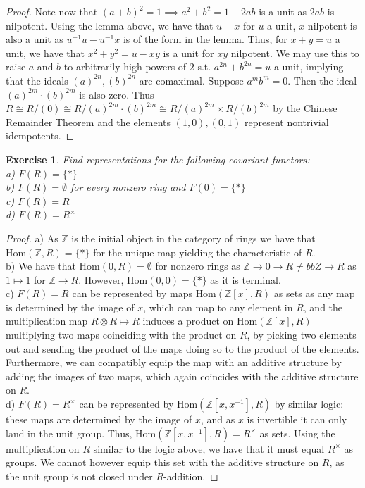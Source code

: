 \documentclass{article}
\newcommand{\Hom}{\text{Hom}}
\newcommand{\bb}[1]{\mathbb{#1}}
\newcommand{\iso}{\cong}
\newtheorem{exercise}{Exercise}
\begin{document}
\begin{proof}
  Note now that $(a + b)^{2} = 1 \implies a^{2}+b^{2} = 1 - 2ab$ is a unit as $2ab$ is nilpotent. Using the lemma above, we have that $u - x$ for $u$ a unit, $x$ nilpotent is also a unit as $u^{-1}u - u^{-1}x$ is of the form in the lemma. Thus, for $x + y = u$ a unit, we have that $x^{2} + y^{2} = u - xy$ is a unit for $xy$ nilpotent. We may use this to raise $a$ and $b$ to arbitrarily high powers of $2$ s.t. $a^{2n} + b^{2n} = u$ a unit, implying that the ideals $(a)^{2n}, (b)^{2n}$ are comaximal. Suppose $a^{m}b^{m} = 0$. Then the ideal $(a)^{2m}\cdot(b)^{2m}$ is also zero. Thus $R \iso R/(0) \iso R/(a)^{2m}\cdot (b)^{2m} \iso R/(a)^{2m} \times R/(b)^{2m}$ by the Chinese Remainder Theorem and the elements $(1,0), (0,1)$ represent nontrivial idempotents.  
\end{proof}

\begin{exercise}
  Find representations for the following covariant functors: \\
  a) $F(R) = \{*\}$ \\
  b) $F(R) = \emptyset$ for every nonzero ring and $F(0) = \{*\}$ \\
  c) $F(R) = R$ \\
  d) $F(R) = R^{\times}$
\end{exercise}
\begin{proof}
  a) As $\bb{Z}$ is the initial object in the category of rings we have that $\Hom(\bb{Z},R) = \{*\}$ for the unique map yielding the characteristic of $R$. \\
  b) We have that $\Hom(0, R) = \emptyset$ for nonzero rings as $\bb{Z} \to 0 \to R \neq bb{Z} \to R$ as $1\mapsto 1$ for $\bb{Z} \to R$. However, $\Hom(0,0) = \{*\}$ as it is terminal.  \\
  c) $F(R) = R$ can be represented by maps $\Hom(\bb{Z}[x], R)$ as sets as any map is determined by the image of $x$, which can map to any element in $R$, and the multiplication map $R \otimes R \mapsto R$ induces a product on $\Hom(\bb{Z}[x], R)$ multiplying two maps coinciding with the product on $R$, by picking two elements out and sending the product of the maps doing so to the product of the elements. Furthermore, we can compatibly equip the map with an additive structure by adding the images of two maps, which again coincides with the additive structure on $R$.  \\
  d) $F(R) = R^{\times}$ can be represented by $\Hom(\bb{Z}[x,x^{-1}], R)$ by similar logic: these maps are determined by the image of $x$, and as $x$ is invertible it can only land in the unit group. Thus, $\Hom(\bb{Z}[x,x^{-1}], R) = R^{\times}$ as sets. Using the multiplication on $R$ similar to the logic above, we have that it must equal $R^{\times}$ as groups. We cannot however equip this set with the additive structure on $R$, as the unit group is not closed under $R$-addition.
\end{proof}
\end{document}
